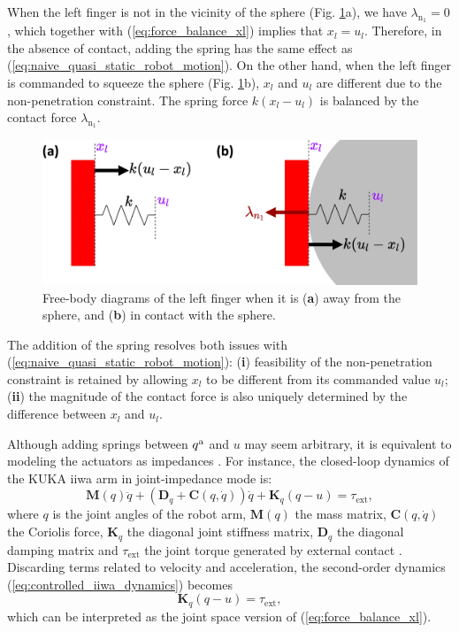 When the left finger is not in the vicinity of the sphere (Fig. \ref{fig:actuator_with_springs}a), we have $\lambda_{\mathrm{n}_1}=0$, which together with (\ref{eq:force_balance_xl}) implies that $x_l = u_l$. Therefore, in the absence of contact, adding the spring has the same effect as (\ref{eq:naive_quasi_static_robot_motion}). On the other hand, when the left finger is commanded to squeeze the sphere (Fig. \ref{fig:actuator_with_springs}b), $x_l$ and $u_l$ are different due to the non-penetration constraint. The spring force $k(x_l - u_l)$ is balanced by the contact force $\lambda_{\mathrm{n}_1}$. 
\begin{figure}
\centering
\includegraphics[width=0.90\linewidth]{figures/02_quasi_static_dynamics/actuator_with_springs.png}
\caption{Free-body diagrams of the left finger when it is (\textbf{a}) away from the sphere, and (\textbf{b}) in contact with the sphere.}
\label{fig:actuator_with_springs}
\end{figure}

The addition of the spring resolves both issues with (\ref{eq:naive_quasi_static_robot_motion}): (\textbf{i}) feasibility of the non-penetration constraint is retained by allowing $x_l$ to be different from its commanded value $u_l$; (\textbf{ii}) the magnitude of the contact force is also uniquely determined by the difference between $x_l$ and $u_l$. 

Although adding springs between ${q^\mathrm{a}}$ and $u$ may seem arbitrary, it is equivalent to modeling the actuators as impedances \cite{hogan1985impedance}. For instance, the closed-loop dynamics of the KUKA iiwa arm in joint-impedance mode is:
\begin{equation}
\label{eq:controlled_iiwa_dynamics}
\mathbf{M}(q)\ddot{q} + \left(\mathbf{D}_q + \mathbf{C}(q, \dot{q}) \right) \dot{q}  + \mathbf{K}_q \left(q - u\right) = \tau_{\text{ext}},
\end{equation}
where $q$ is the joint angles of the robot arm, $\mathbf{M}(q)$ the mass matrix, $\mathbf{C}(q, \dot{q})$ the Coriolis force, $\mathbf{K}_q$ the diagonal joint stiffness matrix, $\mathbf{D}_q$ the diagonal damping matrix and $\tau_{\text{ext}}$ the joint torque generated by external contact \cite{ott2008passivity}. Discarding terms related to velocity and acceleration, the second-order dynamics (\ref{eq:controlled_iiwa_dynamics}) becomes
\begin{equation}
    \mathbf{K}_q \left(q - u\right) = \tau_{\text{ext}},
\end{equation}
which can be interpreted as the joint space version of (\ref{eq:force_balance_xl}).

